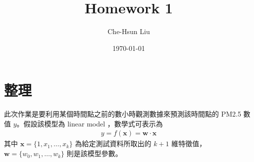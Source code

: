 \documentclass[12pt]{article}
\title{Homework 1}
\author{Che-Hsun Liu}
\date{\today}
\begin{document}
\maketitle
\setlength{\parskip}{1em}

\section{整理}

此次作業是要利用某個時間點之前的數小時觀測數據來預測該時間點的 PM2.5 數值 $y$。假設該模型為 linear model ，數學式可表示為
\begin{align*}
y = f(\mathbf{x}) = \mathbf{w} \cdot \mathbf{x}
\end{align*}
其中 $\mathbf{x} = \{1, x_1, \ldots, x_k\}$ 為給定測試資料所取出的 $k + 1$ 維特徵值， $\mathbf{w} = \{w_0, w_1, \ldots, w_k \}$ 則是該模型參數。
\end{document}
